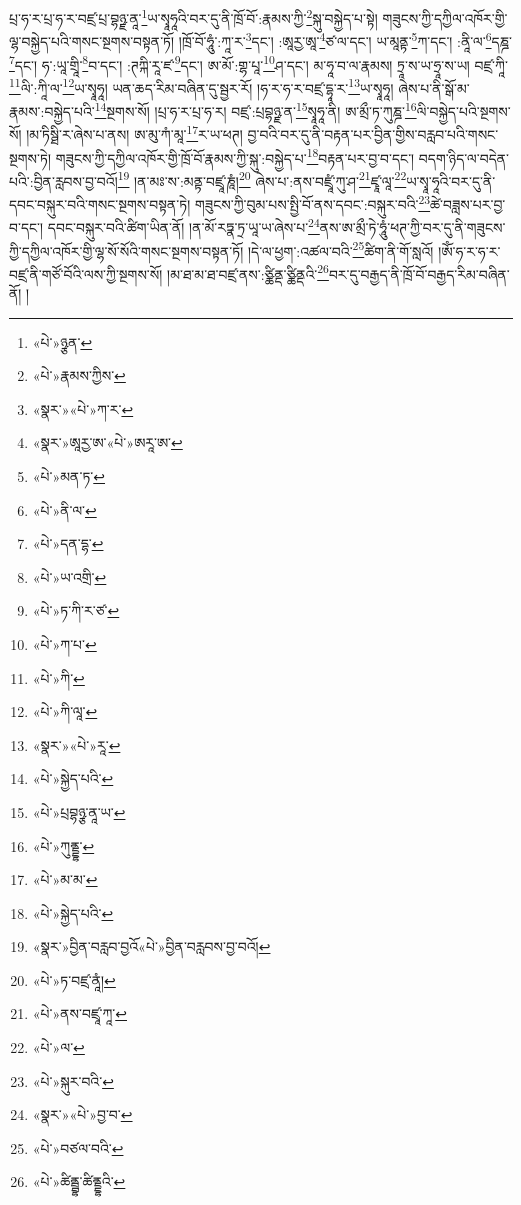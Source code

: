 པྲ་ཧ་ར་པྲ་ཧ་ར་བཛྲ་པྲ་བྷཉྫ་ནཱ་\footnote{«པེ་»ཉྩན་}ཡ་སྭཱཧཱའི་བར་དུ་ནི་ཁྲོ་བོ་:རྣམས་ཀྱི་\footnote{«པེ་»རྣམས་ཀྱིས་}སྐུ་བསྐྱེད་པ་སྟེ། གཟུངས་ཀྱི་དཀྱིལ་འཁོར་གྱི་ལྷ་བསྐྱེད་པའི་གསང་སྔགས་བསྟན་ཏོ། །ཁྲོ་བོ་ཧཱུཾ་:ཀཱ་ར་\footnote{«སྣར་»«པེ་»ཀ་ར་}དང་། :ཨཱརྱ་ཨཱ་\footnote{«སྣར་»ཨཱརྱ་ཨ་«པེ་»ཨརཱ་ཨ་}ཙ་ལ་དང་། ཡ་མཱནྟ་\footnote{«པེ་»མན་ཏ་}ཀ་དང་། :ནཱི་ལ་\footnote{«པེ་»ནི་ལ་}དཎྜ་\footnote{«པེ་»དན་དྷ་}དང་། ཧ་:ཡཱ་གྲཱི་\footnote{«པེ་»ཡ་འགྲི་}བ་དང་། :ཊཀྐི་རཱ་ཛ་\footnote{«པེ་»ཏ་ཀི་ར་ཙ་}དང་། ཨ་མོ་:གྷ་པཱ་\footnote{«པེ་»ཀ་པ་}ཤ་དང་། མ་ཧཱ་བ་ལ་རྣམས། ཏྲཱ་ས་ཡ་ཧྲཱ་ས་ཡ། བཛྲ་ཀཱི་\footnote{«པེ་»ཀི་}ལི་:ཀཱི་ལ་\footnote{«པེ་»ཀི་ལཱ་}ཡ་སྭཱཧཱ། ཡན་ཆད་རིམ་བཞིན་དུ་སྦྱར་རོ། །ཧ་ར་ཧ་ར་བཛྲ་དྷཱ་ར་\footnote{«སྣར་»«པེ་»རཱ་}ཡ་སྭཱཧཱ། ཞེས་པ་ནི་སྒོ་མ་རྣམས་:བསྐྱེད་པའི་\footnote{«པེ་»སྐྱེད་པའི་}སྔགས་སོ། །པྲ་ཧ་ར་པྲ་ཧ་ར། བཛྲ་:པྲབྷཉྫ་ན་\footnote{«པེ་»པྲབྷཉྩ་ནཱ་ཡ་}སྭཱཧཱ་ནི། ཨ་མྲྀ་ཏ་ཀུཎྜ་\footnote{«པེ་»ཀུནྡྷ་}ལི་བསྐྱེད་པའི་སྔགས་སོ། །མ་ཏིསྠི་ར་ཞེས་པ་ནས། ཨ་མུ་ཀཾ་མཱ་\footnote{«པེ་»མ་མ་}ར་ཡ་ཕཊ། བྱ་བའི་བར་དུ་ནི་བརྟན་པར་བྱིན་གྱིས་བརླབ་པའི་གསང་སྔགས་ཏེ། གཟུངས་ཀྱི་དཀྱིལ་འཁོར་གྱི་ཁྲོ་བོ་རྣམས་ཀྱི་སྐུ་:བསྐྱེད་པ་\footnote{«པེ་»སྐྱེད་པའི་}བརྟན་པར་བྱ་བ་དང་། བདག་ཉིད་ལ་བདེན་པའི་:བྱིན་རླབས་བྱ་བའོ།\footnote{«སྣར་»བྱིན་བརླབ་བྱའོ«པེ་»བྱིན་བརླབས་བྱ་བའོ།} །ན་མཿ་ས་:མནྟ་བཛྲཱ་ཎཱཾ།\footnote{«པེ་»ཏ་བཛྲ་ནཱཾ།} ཞེས་པ་:ནས་བཛྲཱཾ་ཀུ་ཤ་\footnote{«པེ་»ནས་བཛྲཱ་ཀཱ་}ཛྭཱ་ལཱ་\footnote{«པེ་»ལ་}ཡ་སྭཱ་ཧཱའི་བར་དུ་ནི་དབང་བསྐུར་བའི་གསང་སྔགས་བསྟན་ཏེ། གཟུངས་ཀྱི་བུམ་པས་སྤྱི་བོ་ནས་དབང་:བསྐུར་བའི་\footnote{«པེ་»སྐུར་བའི་}ཚེ་བཟླས་པར་བྱ་བ་དང་། དབང་བསྐུར་བའི་ཚིག་ཡིན་ནོ། །ན་མོ་རཏྣ་ཏྲ་ཡཱ་ཡ་ཞེས་པ་\footnote{«སྣར་»«པེ་»བྱ་བ་}ནས་ཨ་མྲྀ་ཏེ་ཧཱུཾ་ཕཊ་ཀྱི་བར་དུ་ནི་གཟུངས་ཀྱི་དཀྱིལ་འཁོར་གྱི་ལྷ་སོ་སོའི་གསང་སྔགས་བསྟན་ཏོ། །དེ་ལ་ཕྱག་:འཚལ་བའི་\footnote{«པེ་»བཙལ་བའི་}ཚིག་ནི་གོ་སླའོ། །ཨོཾ་ཧ་ར་ཧ་ར་བཛྲ་ནི་གཙོ་བོའི་ལས་ཀྱི་སྔགས་སོ། །མ་ཐ་མ་ཐ་བཛྲ་ནས་:ཙྪིནྡ་ཙྪིནྡའི་\footnote{«པེ་»ཚིནྦྷ་ཚིནྡྷའི་}བར་དུ་བརྒྱད་ནི་ཁྲོ་བོ་བརྒྱད་རིམ་བཞིན་ནོ། །

